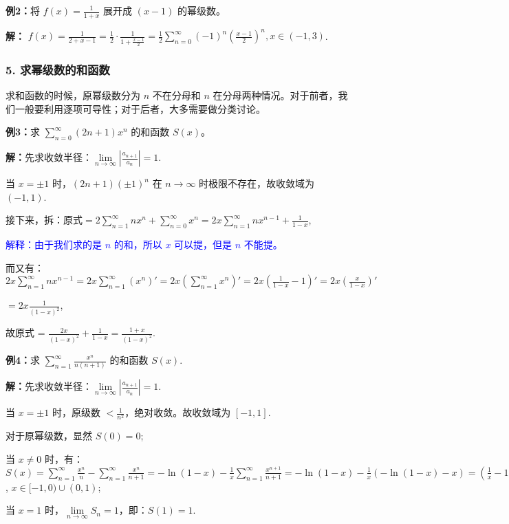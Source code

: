 \documentclass[b5paper]{ctexart}
\newcommand{\jst}{\sum \limits_{n = 1}^{\infty}}
\newcommand{\mjst}{\sum \limits_{n = 0}^{\infty}}
\newcommand \jx[3]{\lim\limits_{#1 \to #2} #3}
\begin{document}
	\textbf{例2：}将 $f(x) = \frac{1}{1 + x}$ 展开成 $(x - 1)$ 的幂级数。
	
	\textbf{解：} $f(x) = \frac{1}{2 + x - 1} = \frac{1}{2} \cdot \frac{1}{1 + \frac{x - 1}{2}} = \frac{1}{2} \mjst (-1)^n (\frac{x - 1}{2})^n, x \in (-1, 3)$.
	
	\subsubsection*{5. 求幂级数的和函数}
	
	求和函数的时候，原幂级数分为 $n$ 不在分母和 $n$ 在分母两种情况。对于前者，我们一般要利用逐项可导性；对于后者，大多需要做分类讨论。
	
	\vspace{12pt}
	
	\textbf{例3：}求 $\mjst (2n + 1) x^n$ 的和函数 $S(x)$。
	
	\textbf{解：}先求收敛半径：$\jx{n}{\infty}{|\frac{a_{n + 1}}{a_n}|} = 1$.
	
	当 $x = \pm 1$ 时，$(2n + 1) (\pm 1)^n$ 在 $n \to \infty$ 时极限不存在，故收敛域为 $(-1, 1)$.
	
	接下来，拆：原式$ = 2 \jst nx^n + \mjst x^n = 2x \jst nx^{n - 1} + \frac{1}{1 - x}$,
	
	\textcolor{blue}{\kaishu 解释：由于我们求的是 $n$ 的和，所以 $x$ 可以提，但是 $n$ 不能提。}
	
	而又有：$2x\jst nx^{n - 1} = 2x\jst (x^n)' = 2x(\jst x^n)' = 2x(\frac{1}{1 - x} - 1)' = 2x (\frac{x}{1 - x})'$
	
	$ = 2x \frac{1}{(1 - x)^2}$,
	
	故原式 = $\frac{2x}{(1 - x)^2} + \frac{1}{1 - x} = \frac{1 + x}{(1 - x)^2}$.
	
	\vspace{12pt}
	
	\textbf{例4：}求 $\jst \frac{x^n}{n(n + 1)}$ 的和函数 $S(x)$.
	
	\textbf{解：}先求收敛半径：$\jx{n}{\infty}{|\frac{a_{n + 1}}{a_n}|} = 1$.
	
	当 $x = \pm 1$ 时，原级数 $< \frac{1}{n^2}$，绝对收敛。故收敛域为 $[-1, 1]$.
	
	对于原幂级数，显然 $S(0) = 0$;
	
	当 $x \ne 0$ 时，有：$S(x) = \jst \frac{x^n}{n} - \jst \frac{x^n}{n + 1} = -\ln (1 - x) - \frac{1}{x} \jst \frac{x^{n + 1}}{n + 1} = -\ln (1 - x) - \frac{1}{x} (-\ln (1 - x) - x) = (\frac{1}{x} - 1) \ln(1 - x) + 1$,
	$x \in [-1, 0) \cup (0, 1)$;
	
	当 $x = 1$ 时，$\jx{n}{\infty}{S_n} = 1$，即：$S(1) = 1$.
	
\end{document}
